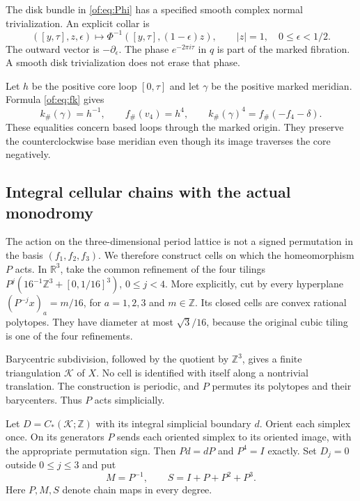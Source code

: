 The disk bundle in \eqref{of:eq:Phi} has a specified smooth complex normal
trivialization. An explicit collar is
\[
 ([y,\tau],z,\epsilon)\longmapsto
 \Phi^{-1}([y,\tau],(1-\epsilon)z),\qquad |z|=1,\quad0\le\epsilon<1/2.
\]
The outward vector is $-\partial_\epsilon$.
The phase $e^{-2\pi i\tau}$ in $q$ is part of the marked fibration.
A smooth disk trivialization does not erase that phase.

Let $h$ be the positive core loop $[0,\tau]$ and let $\gamma$ be the
positive marked meridian. Formula \eqref{of:eq:fk} gives
\begin{equation}\label{of:eq:pi}
 k_\#(\gamma)=h^{-1},\qquad f_\#(v_4)=h^4,
 \qquad k_\#(\gamma)^4=f_\#(-f_4-\delta).
\end{equation}
These equalities concern based loops through the marked origin.
They preserve the counterclockwise base meridian even though its image
traverses the core negatively.

\subsection{Integral cellular chains with the actual monodromy}

The action on the three-dimensional period lattice is not a signed
permutation in the basis $(f_1,f_2,f_3)$.
We therefore construct cells on which the homeomorphism $P$ acts.
In $\mathbb R^3$, take the common refinement of the four tilings
$P^j(16^{-1}\mathbb Z^3+[0,1/16]^3)$, $0\le j<4$.
More explicitly, cut by every hyperplane
$(P^{-j}x)_a=m/16$, for $a=1,2,3$ and $m\in\mathbb Z$.
Its closed cells are convex rational polytopes.
They have diameter at most $\sqrt3/16$, because the original cubic tiling
is one of the four refinements.

Barycentric subdivision, followed by the
quotient by $\mathbb Z^3$, gives a finite triangulation $\mathcal K$ of $X$.
No cell is identified with itself along a nontrivial translation.
The construction is periodic, and $P$ permutes its polytopes and their
barycenters. Thus $P$ acts simplicially.

Let $D=C_*(\mathcal K;\mathbb Z)$ with its integral simplicial boundary $d$.
Orient each simplex once. On its generators $P$ sends each oriented simplex
to its oriented image, with the appropriate permutation sign.
Then $Pd=dP$ and $P^4=I$ exactly.
Set $D_j=0$ outside $0\le j\le3$ and put
\[
                         M=P^{-1},\qquad S=I+P+P^2+P^3.
\]
Here $P,M,S$ denote chain maps in every degree.

